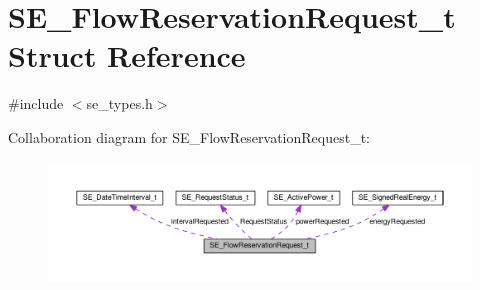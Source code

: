 \hypertarget{structSE__FlowReservationRequest__t}{}\section{S\+E\+\_\+\+Flow\+Reservation\+Request\+\_\+t Struct Reference}
\label{structSE__FlowReservationRequest__t}


{\ttfamily \#include $<$se\+\_\+types.\+h$>$}



Collaboration diagram for S\+E\+\_\+\+Flow\+Reservation\+Request\+\_\+t\+:\nopagebreak
\begin{figure}[H]
\begin{center}
\leavevmode
\includegraphics[width=350pt]{structSE__FlowReservationRequest__t__coll__graph}
\end{center}
\end{figure}
